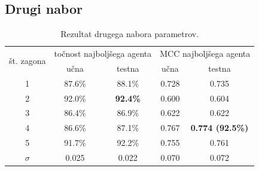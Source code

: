 \subsection{Drugi nabor}\label{subsec:dodatek-statlog-drugi-nabor}
\begin{table}[H]
    \begin{center}
        \begin{tabular}{|| c | c c || c c ||}
            \hline
            \multirow{2}{*}{št. zagona} & \multicolumn{2}{c||}{točnost najboljšega agenta} & \multicolumn{2}{c||}{MCC najboljšega agenta} \\ \cline{2-5}
            & učna   & testna          & učna  & testna                  \\
            \hline
            1        & 87.6\% & 88.1\%          & 0.728 & 0.735                   \\
            \hline
            2        & 92.0\% & \textbf{92.4\%} & 0.600 & 0.604                   \\
            \hline
            3        & 86.4\% & 86.9\%          & 0.622 & 0.622                   \\
            \hline
            4        & 86.6\% & 87.1\%          & 0.767 & \textbf{0.774 (92.5\%)} \\
            \hline
            5        & 91.7\% & 92.2\%          & 0.755 & 0.761                   \\
            \hline
            $\sigma$ & 0.025  & 0.022           & 0.070 & 0.072                   \\
            \hline
        \end{tabular}
    \end{center}
    \caption{Rezultat drugega nabora parametrov.}
    \label{tab:statlog_result_2}
\end{table}


